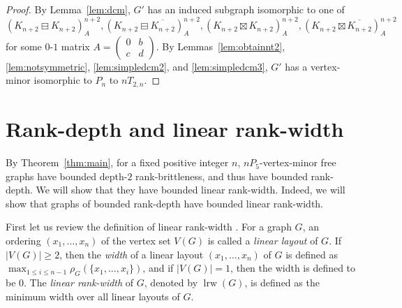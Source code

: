 \documentclass[11pt]{article}
\newcommand\abs[1]{\lvert #1\rvert}
\newcommand\mat{\boxminus}
\newcommand\antimat{\boxtimes}
\def\S_#1{\overline{K_{#1}}}
\newcommand\cutrk{\rho}
\newcommand\lrw{\operatorname{lrw}}
\begin{document}
\begin{proof}
                By Lemma~\ref{lem:dcm},
                $G'$ has an induced subgraph isomorphic to
                one of 
                \[(K_{n+2}\mat K_{n+2})^{n+2}_A,
                  (K_{n+2}\mat \S_{n+2})^{n+2}_A,
                  (K_{n+2}\antimat K_{n+2})^{n+2}_A, 
                  (K_{n+2}\antimat \S_{n+2})^{n+2}_A\]
                for some $0$-$1$ matrix $A=
                (\begin{smallmatrix}
                  0&b \\c&d 
                \end{smallmatrix})$.
                By Lemmas~\ref{lem:obtainnt2}, \ref{lem:notsymmetric}, \ref{lem:simpledcm2}, and \ref{lem:simpledcm3},
                $G'$ has a vertex-minor isomorphic to $P_n$ to $nT_{2,n}$.
      \end{proof}
	
		\section{Rank-depth and linear rank-width}\label{sec:application}
	
	By Theorem~\ref{thm:main}, 
for a fixed positive integer $n$, 
$nP_5$-vertex-minor free graphs have bounded 
depth-$2$ rank-brittleness, and thus have bounded rank-depth.
We will show that
they have bounded linear rank-width. 
Indeed, we will show that graphs of bounded rank-depth
have bounded linear rank-width.
	
	First let us review the definition of linear rank-width \cite{Ganian2011,JKO2014,Oum2016}.
For a graph $G$, an ordering $(x_1, \ldots, x_n)$ of the vertex set $V(G)$ is called a \emph{linear layout} of $G$.  
	If $\abs{V(G)}\ge 2$, then the \emph{width} of a linear layout $(x_1,\ldots, x_n)$ of $G$ is defined
as
$\displaystyle\max_{1\le i\le n-1}\cutrk_G(\{x_1,\ldots,x_i\})$,
and if $\abs{V(G)}=1$, then the width is defined to be $0$.
	The \emph{linear rank-width} of $G$, denoted by $\lrw(G)$, is defined as the minimum width over all linear layouts of $G$. 
	
	
%
%
\end{document}
